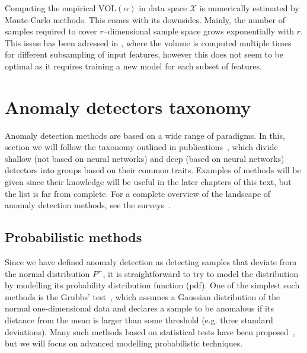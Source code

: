 Computing the empirical $\text{VOL}(\alpha)$ in data space $\mathcal{X}$ is numerically estimated by Monte-Carlo methods. This comes with its downsides. Mainly, the number of samples required to cover $r$--dimensional sample space grows exponentially with $r$. This issue has been adressed in \cite{goix2016evaluate}, where the volume is computed multiple times for different subsampling of input features, however this does not seem to be optimal as it requires training a new model for each subset of features.


\section{Anomaly detectors taxonomy}

Anomaly detection methods are based on a wide range of paradigms. In this, section we will follow the taxonomy outlined in publications~\cite{pimentel2014review, ruff2020unifying}, which divide shallow (not based on neural networks) and deep (based on neural networks) detectors into groups based on their common traits. Examples of methods will be given since their knowledge will be useful in the later chapters of this text, but the list is far from complete. For a complete overview of the landscape of anomaly detection methods, see the surveys~\cite{pimentel2014review, campos2016evaluation, goldstein2016comparative, moustafa2019holistic, kwon2019survey, fernandes2019comprehensive, wang2019progress, chalapathy2019deep,ruff2020unifying}.

\subsection{Probabilistic  methods}
Since we have defined anomaly detection as detecting samples that deviate from the normal distribution $P^+$, it is straightforward to try to model the distribution by modelling its probability distribution function (pdf). One of the simplest such methods is the Grubbs' test~\cite{grubbs1969procedures}, which assumes a Gaussian distribution of the normal one-dimensional data and declares a sample to be anomalous if its distance from the mean is larger than some threshold (e.g. three standard deviations). Many such methods based on statistical tests have been proposed~\cite{barnett1994outliers}, but we will focus on advanced modelling probabilistic techniques.

